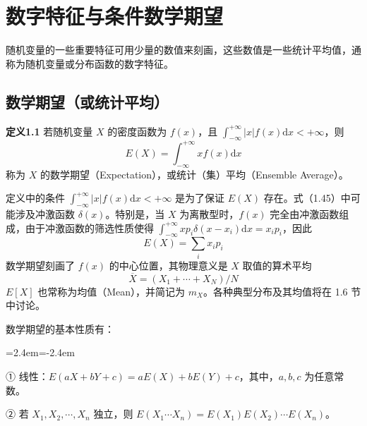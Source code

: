 \documentclass[11pt,openany,UTF8]{ctexbook}
\newcommand{\dif}{\mathrm{d}}                      %
\newcommand{\E}{E}                                 %
\newcommand{\thm}[1]{\par\medskip\noindent\textbf{#1}\quad}
\newenvironment{citemize}
  {\begin{list}{}{\leftmargin=2.4em\itemindent=-2.4em\itemsep=1pt\topsep=3pt\parsep=0pt}}
  {\end{list}}
\begin{document}
\section{数字特征与条件数学期望}

随机变量的一些重要特征可用少量的数值来刻画\nobreak，这些数值是一些统计平均值\nobreak，通称为随机变量或分布函数的数字特征\nobreak。

\subsection{数学期望（或统计平均\nobreak）}

\thm{定义1.1} 若随机变量 $X$ 的密度函数为 $f(x)$\nobreak，且 $\int_{-\infty}^{+\infty}\lvert x\rvert f(x)\dif x<+\infty$\nobreak，则
\begin{equation}
\E(X)=\int_{-\infty}^{+\infty}xf(x)\dif x
\label{eq:1.45}
\end{equation}
称为 $X$ 的数学期望（Expectation\nobreak）\nobreak，或统计（集\nobreak）平均（Ensemble Average\nobreak）\nobreak。

定义中的条件 $\int_{-\infty}^{+\infty}\lvert x\rvert f(x)\dif x<+\infty$ 是为了保证 $\E(X)$ 存在\nobreak。式（1.45\nobreak）中可能涉及冲激函数 $\delta(x)$\nobreak。特别是\nobreak，当 $X$ 为离散型时\nobreak，$f(x)$ 完全由冲激函数组成\nobreak，由于冲激函数的筛选性质使得 $\int_{-\infty}^{+\infty}xp_i\delta(x-x_i)\dif x=x_ip_i$\nobreak，因此
\begin{equation}
\E(X)=\sum_i x_ip_i
\label{eq:1.46}
\end{equation}
数学期望刻画了 $f(x)$ 的中心位置\nobreak，其物理意义是 $X$ 取值的算术平均
\[
\overline{X}=(X_1+\cdots+X_N)/N
\]
$\E[X]$ 也常称为均值（Mean\nobreak）\nobreak，并简记为 $m_X$\nobreak。各种典型分布及其均值将在 1.6 节中讨论\nobreak。

数学期望的基本性质有\nobreak：

\begin{citemize}
  \item ① 线性\nobreak：$\E(aX+bY+c)=a\E(X)+b\E(Y)+c$\nobreak，其中\nobreak，$a,b,c$ 为任意常数\nobreak。
  \item ② 若 $X_1,X_2,\cdots,X_n$ 独立\nobreak，则 $\E(X_1\cdots X_n)=\E(X_1)\E(X_2)\cdots\E(X_n)$\nobreak。
\end{citemize}
\end{document}
